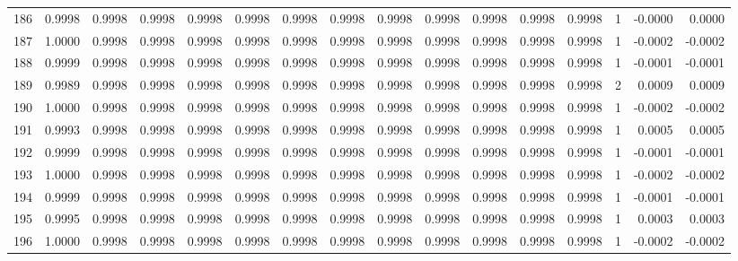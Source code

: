 \begin{tabular}{lrrrrrrrrrrrrrrr}
186 &      0.9998 &  0.9998 &  0.9998 &  0.9998 &  0.9998 &  0.9998 &  0.9998 &  0.9998 &  0.9998 &  0.9998 &   0.9998 &     0.9998 &      1 &                   -0.0000 &                     0.0000 \\
187 &      1.0000 &  0.9998 &  0.9998 &  0.9998 &  0.9998 &  0.9998 &  0.9998 &  0.9998 &  0.9998 &  0.9998 &   0.9998 &     0.9998 &      1 &                   -0.0002 &                    -0.0002 \\
188 &      0.9999 &  0.9998 &  0.9998 &  0.9998 &  0.9998 &  0.9998 &  0.9998 &  0.9998 &  0.9998 &  0.9998 &   0.9998 &     0.9998 &      1 &                   -0.0001 &                    -0.0001 \\
189 &      0.9989 &  0.9998 &  0.9998 &  0.9998 &  0.9998 &  0.9998 &  0.9998 &  0.9998 &  0.9998 &  0.9998 &   0.9998 &     0.9998 &      2 &                    0.0009 &                     0.0009 \\
190 &      1.0000 &  0.9998 &  0.9998 &  0.9998 &  0.9998 &  0.9998 &  0.9998 &  0.9998 &  0.9998 &  0.9998 &   0.9998 &     0.9998 &      1 &                   -0.0002 &                    -0.0002 \\
191 &      0.9993 &  0.9998 &  0.9998 &  0.9998 &  0.9998 &  0.9998 &  0.9998 &  0.9998 &  0.9998 &  0.9998 &   0.9998 &     0.9998 &      1 &                    0.0005 &                     0.0005 \\
192 &      0.9999 &  0.9998 &  0.9998 &  0.9998 &  0.9998 &  0.9998 &  0.9998 &  0.9998 &  0.9998 &  0.9998 &   0.9998 &     0.9998 &      1 &                   -0.0001 &                    -0.0001 \\
193 &      1.0000 &  0.9998 &  0.9998 &  0.9998 &  0.9998 &  0.9998 &  0.9998 &  0.9998 &  0.9998 &  0.9998 &   0.9998 &     0.9998 &      1 &                   -0.0002 &                    -0.0002 \\
194 &      0.9999 &  0.9998 &  0.9998 &  0.9998 &  0.9998 &  0.9998 &  0.9998 &  0.9998 &  0.9998 &  0.9998 &   0.9998 &     0.9998 &      1 &                   -0.0001 &                    -0.0001 \\
195 &      0.9995 &  0.9998 &  0.9998 &  0.9998 &  0.9998 &  0.9998 &  0.9998 &  0.9998 &  0.9998 &  0.9998 &   0.9998 &     0.9998 &      1 &                    0.0003 &                     0.0003 \\
196 &      1.0000 &  0.9998 &  0.9998 &  0.9998 &  0.9998 &  0.9998 &  0.9998 &  0.9998 &  0.9998 &  0.9998 &   0.9998 &     0.9998 &      1 &                   -0.0002 &                    -0.0002 \\

\end{tabular}
